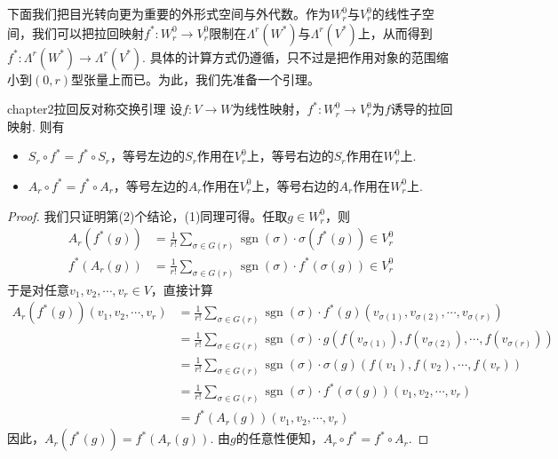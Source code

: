 下面我们把目光转向更为重要的外形式空间与外代数。作为$W^{0}_{r}$与$V^{0}_{r}$的线性子空间，我们可以把拉回映射$f^{\ast}:W^{0}_{r}\longrightarrow V^{0}_{r}$限制在$\Lambda^{r}(W^{\ast})$与$\Lambda^{r}(V^{\ast})$上，从而得到$f^{\ast}:\Lambda^{r}(W^{\ast})\longrightarrow \Lambda^{r}(V^{\ast})$. 具体的计算方式仍遵循，只不过是把作用对象的范围缩小到$(0,r)$型{\color{purple}{反对称}}张量上而已。为此，我们先准备一个引理。

\begin{mylem}{}{chapter2拉回反对称交换引理}
	设$f:V\longrightarrow W$为线性映射，$f^{\ast}:W^{0}_{r}\longrightarrow V^{0}_{r}$为$f$诱导的拉回映射. 则有
\begin{itemize}
\item[(1)] $S_{r}\circ f^{\ast}=f^{\ast}\circ S_{r}$，等号左边的$S_{r}$作用在$V^{0}_{r}$上，等号右边的$S_{r}$作用在$W^{0}_{r}$上.
\item[(2)] $A_{r}\circ f^{\ast}=f^{\ast}\circ A_{r}$，等号左边的$A_{r}$作用在$V^{0}_{r}$上，等号右边的$A_{r}$作用在$W^{0}_{r}$上.
\end{itemize}
\end{mylem}

\begin{proof}
我们只证明第(2)个结论，(1)同理可得。任取$g\in W^{0}_{r}$，则
\[
\begin{split}
	A_{r}\left( f^{\ast}(g) \right)&=\frac{1}{r!}\sum_{\sigma\in G(r)}\operatorname{sgn}(\sigma)\cdot \sigma \left( f^{\ast}(g) \right) \in V^{0}_{r}\\
	f^{\ast} \left( A_{r}(g) \right)&=\frac{1}{r!}\sum_{\sigma\in G(r)}\operatorname{sgn}(\sigma)\cdot f^{\ast}\left(\sigma(g)\right) \in V^{0}_{r}
\end{split}
\]
于是对任意$v_{1},v_{2},\cdots,v_{r}\in V$，直接计算
\[
\begin{split}
	A_{r}\left( f^{\ast}(g) \right) \left( v_{1},v_{2},\cdots,v_{r} \right)&=\frac{1}{r!}\sum_{\sigma\in G(r)}\operatorname{sgn}(\sigma)\cdot f^{\ast}(g)\left( v_{\sigma(1)},v_{\sigma(2)},\cdots,v_{\sigma(r)} \right)\\
	&=\frac{1}{r!}\sum_{\sigma\in G(r)}\operatorname{sgn}(\sigma)\cdot g\left( f(v_{\sigma(1)}),f(v_{\sigma(2)}),\cdots,f(v_{\sigma(r)}) \right)\\
	&=\frac{1}{r!}\sum_{\sigma\in G(r)}\operatorname{sgn}(\sigma)\cdot \sigma(g)\left( f(v_{1}),f(v_{2}),\cdots,f(v_{r}) \right)\\
	&=\frac{1}{r!}\sum_{\sigma\in G(r)}\operatorname{sgn}(\sigma)\cdot f^{\ast}(\sigma(g))\left( v_{1},v_{2},\cdots,v_{r} \right)\\
	&=f^{\ast} \left( A_{r}(g) \right)\left( v_{1},v_{2},\cdots,v_{r} \right)
\end{split}
\]
因此，$A_{r}\left( f^{\ast}(g) \right)=f^{\ast} \left( A_{r}(g) \right)$. 由$g$的任意性便知，$A_{r}\circ f^{\ast}=f^{\ast}\circ A_{r}$.
\end{proof}

